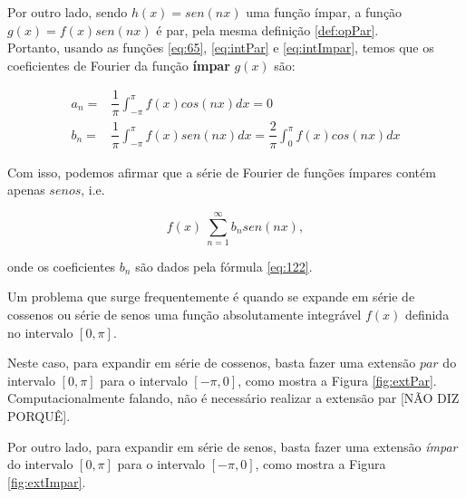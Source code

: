     Por outro lado, sendo $h(x) = sen(nx)$ uma função ímpar, a função $g(x) = f(x)sen(nx)$ é par, pela mesma 
    definição \ref{def:opPar}.\\
    
    Portanto, usando as funções \ref{eq:65}, \ref{eq:intPar} e \ref{eq:intImpar}, temos 
    que os coeficientes de Fourier da função \textbf{ímpar} $g(x)$ são:

    \begin{equation}
    \label{eq:122}
        \begin{split}
            a_n = &\dfrac{1}{\pi}\int_{-\pi}^{\pi}f(x)cos(nx) dx = 0 \\
            b_n = &\dfrac{1}{\pi}\int_{-\pi}^{\pi}f(x)sen(nx) dx = \dfrac{2}{\pi}\int_{0}^{\pi} f(x)cos(nx) dx 
        \end{split}
    \end{equation}

    Com isso, podemos afirmar que a série de Fourier de funções ímpares contém apenas $senos$, i.e.

    \begin{equation}
        f(x) ~ \sum\limits_{n=1}^{\infty}b_n sen(nx),
    \end{equation}

    onde os coeficientes $b_n$ são dados pela fórmula \ref{eq:122}.

    Um problema que surge frequentemente é quando se expande em série de cossenos
    ou série de senos uma função absolutamente integrável $f(x)$ definida no
    intervalo $[0,\pi]$. 

    Neste caso, para expandir em série de cossenos, basta fazer uma extensão $par$ 
    do intervalo $[0,\pi]$ para o intervalo $[-\pi,0]$, como mostra a Figura 
    \ref{fig:extPar}. Computacionalmente falando, não é necessário realizar a extensão
    par [NÃO DIZ PORQUÊ].

    Por outro lado, para expandir em série de senos, basta fazer uma extensão \textit{ímpar}
    do intervalo $[0,\pi]$ para o intervalo $[-\pi,0]$, como mostra a Figura 
    \ref{fig:extImpar}.

